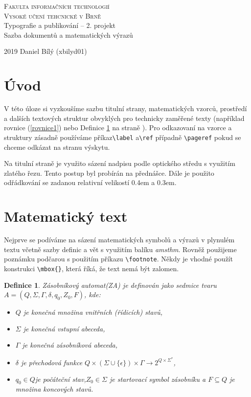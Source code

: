 \documentclass[a4paper, 11pt]{article}
\newtheorem{Definice}{Definice}
\begin{document}
\begin{center}
\thispagestyle{empty}
\Huge{\textsc{Fakulta informačních technologií\\
\linespread{0.4em}
Vysoké učení tehcnické v Brně}}\\
\LARGE{Typografie a publikování – 2. projekt\\ 
\linespread{0.3em}
Sazba dokumentů a matematických výrazů}\\
\end{center}
\linespread{1.0}
\LARGE{2019 \hfill Daniel Bílý (xbilyd01)}

\normalsize
\pagebreak
\begin{twocolumn}
\section*{Úvod}
V této úloze si vyzkoušíme sazbu titulní strany, matematických vzorců, prostředí a dalších textových struktur obvyklých pro technicky zaměřené texty (například rovnice (\ref{rovnice1}) nebo Definice \ref{definice1} na straně \pageref{definice1}). Pro odkazovaní na vzorce a struktury zásadně používáme příkaz\verb|\label| a\verb|\ref| případně \verb|\pageref| pokud se chceme odkázat na stranu výskytu.\par Na titulní straně je využito sázení nadpisu podle optického středu s využitím zlatého řezu. Tento postup byl probírán na přednášce. Dále je použito odřádkování se zadanou relativní velikostí 0.4em a 0.3em.

\section{Matematický text}
Nejprve se podíváme na sázení matematických symbolů a výrazů v plynulém textu včetně sazby definic a vět s využitím balíku \emph{amsthm}. Rovněž použijeme poznámku podčarou s použitím příkazu \verb|\footnote|. Někdy je vhodné použít konstrukci \verb|\mbox{}|, která říká, že text nemá být zalomen.

\begin{Definice}
\label{definice1}
Zásobníkový automat(ZA) je definován jako sedmice tvaru \(A = (Q,\Sigma,\Gamma,\delta,q_0,Z_0,F)\), kde:
\begin{itemize}
\item $Q$ je konečná množina vnitřních (řídicích) stavů,
\item $\Sigma$ je konečná vstupní abeceda,
\item $\Gamma$ je konečná zásobníková abeceda,
\item $\delta$ je přechodová funkce $Q \times (\Sigma \cup \{\epsilon\}) \times \Gamma \rightarrow 2 ^{Q \times \Sigma ^\ast} $,
\item $q_0 \in Q $je počáteční stav,$Z_0 \in \Sigma$ je startovací symbol zásobníku a $F \subseteq Q$ je množina koncových stavů.
\end{itemize}


\end{Definice}
\end{twocolumn}
\end{document}

